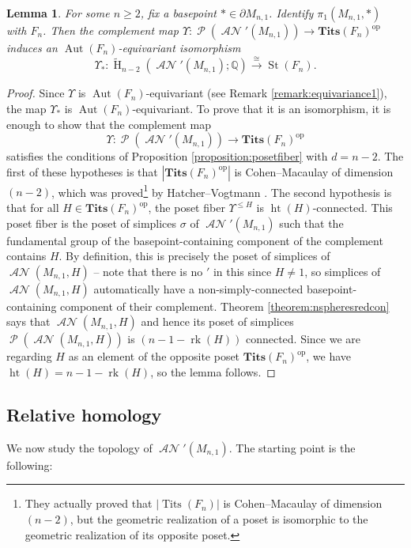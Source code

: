 \documentclass[11pt]{amsart}
\numberwithin{equation}{section}
\theoremstyle{plain}
\newtheorem{lemma}[theorem]{Lemma}
\theoremstyle{definition}
\theoremstyle{remark}
\newcommand\Q{\ensuremath{\mathbb{Q}}}
\DeclareMathOperator{\HH}{H}
\newcommand\RH{\ensuremath{\widetilde{\HH}}}
\DeclareMathOperator{\rank}{rk}
\DeclareMathOperator{\Aut}{Aut}
\newcommand\BTits{\ensuremath{\mathbf{Tits}  }}
\DeclareMathOperator{\Tits}{Tits}
\DeclareMathOperator{\St}{St}
\DeclareMathOperator{\ANSpheres}{\mathcal{AN}}
\DeclareMathOperator{\height}{ht}
\DeclareMathOperator{\Poset}{\mathcal{P}}
\DeclareMathOperator{\opp}{op}
\begin{document}
\begin{lemma}
\label{lemma:spaniso}
For some $n \geq 2$, fix a basepoint $\ast \in \partial M_{n,1}$.  Identify $\pi_1(M_{n,1},\ast)$ with $F_n$. 
Then the complement map 
$\Upsilon\colon \Poset(\ANSpheres'(M_{n,1})) \rightarrow \BTits(F_n)^{\opp}$ induces an $\Aut(F_n)$-equivariant isomorphism
\[\Upsilon_{\ast}\colon \RH_{n-2}(\ANSpheres'(M_{n,1});\Q) \stackrel{\cong}{\longrightarrow} \St(F_n).\]
\end{lemma}
\begin{proof}
Since $\Upsilon$ is $\Aut(F_n)$-equivariant (see Remark \ref{remark:equivariance1}), the map $\Upsilon_{\ast}$
is $\Aut(F_n)$-equivariant.
To prove that it is an isomorphism, it is enough to show that the complement map
\[\Upsilon\colon \Poset(\ANSpheres'(M_{n,1})) \rightarrow \BTits(F_n)^{\opp}\]
satisfies the conditions of Proposition \ref{proposition:posetfiber} with $d = n-2$.
The first of these hypotheses is that $|\BTits(F_n)^{\opp}|$ is Cohen--Macaulay of dimension $(n-2)$,
which was proved\footnote{They actually proved that $|\Tits(F_n)|$ is Cohen--Macaulay of dimension $(n-2)$,
but the geometric realization of a poset is isomorphic to the geometric realization of its opposite poset.}
by Hatcher--Vogtmann \cite[\S 4]{HatcherVogtmann, HatcherVogtmannRevised}.  The second hypothesis is that for all $H \in \BTits(F_n)^{\opp}$,
the poset fiber $\Upsilon^{\leq H}$ is $\height(H)$-connected.  This poset fiber is the poset of simplices
$\sigma$ of $\ANSpheres'(M_{n,1})$ such that the fundamental group of the basepoint-containing
component of the complement contains $H$.  By definition, this is precisely the poset of simplices
of $\ANSpheres(M_{n,1},H)$ -- note that there is no $'$ in this since $H \neq 1$, so simplices
of $\ANSpheres(M_{n,1},H)$ automatically have a non-simply-connected basepoint-containing component
of their complement.  Theorem \ref{theorem:nspheresredcon} says that $\ANSpheres(M_{n,1},H)$ and hence
its poset of simplices $\Poset(\ANSpheres(M_{n,1},H))$ is $(n-1-\rank(H))$ connected.  Since we are regarding
$H$ as an element of the opposite poset $\BTits(F_n)^{\opp}$, we have $\height(H) = n-1-\rank(H)$,
so the lemma follows.
\end{proof} 

\subsection{Relative homology}
We now study the topology of $\ANSpheres'(M_{n,1})$.  The starting point is the following:
\end{document}
